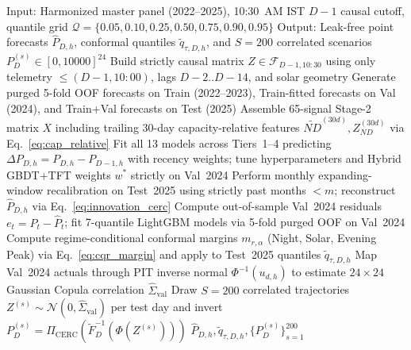 \documentclass[journal,10pt,twocolumn]{IEEEtran}
\begin{document}
\begin{algorithm*}[!t]
\caption{Strict D-1 Causal Stage-1 Exogenous Reconstruction, Multi-Tier Training, and Residual-CQR Scenario Generation}
\label{alg:causal_pipeline}
\footnotesize
\begin{algorithmic}[1]
\State Input: Harmonized master panel (2022--2025), 10:30~AM IST $D-1$ causal cutoff, quantile grid $\mathcal{Q} = \{0.05, 0.10, 0.25, 0.50, 0.75, 0.90, 0.95\}$
\State Output: Leak-free point forecasts $\hat{P}_{D,h}$, conformal quantiles $\tilde{q}_{\tau, D, h}$, and $S=200$ correlated scenarios $P_D^{(s)} \in [0, 10000]^{24}$
    \State Build strictly causal matrix $Z \in \mathcal{F}_{D-1, 10:30}$ using only telemetry $\le (D-1, 10:00)$, lags $D-2..D-14$, and solar geometry
    \State Generate purged 5-fold OOF forecasts on Train (2022--2023), Train-fitted forecasts on Val (2024), and Train+Val forecasts on Test (2025)
\EndFor
\State Assemble 65-signal Stage-2 matrix $X$ including trailing 30-day capacity-relative features $\widetilde{ND}^{(30d)}, Z_{ND}^{(30d)}$ via Eq.~\ref{eq:cap_relative}
\State Fit all 13 models across Tiers~1--4 predicting $\Delta P_{D,h} = P_{D,h} - P_{D-1,h}$ with recency weights; tune hyperparameters and Hybrid GBDT+TFT weights $w^*$ strictly on Val~2024
\State Perform monthly expanding-window recalibration on Test~2025 using strictly past months $< m$; reconstruct $\hat{P}_{D,h}$ via Eq.~\ref{eq:innovation_cerc}
\State Compute out-of-sample Val~2024 residuals $e_t = P_t - \hat{P}_t$; fit 7-quantile LightGBM models via 5-fold purged OOF on Val~2024
\State Compute regime-conditional conformal margins $m_{r, \alpha}$ (Night, Solar, Evening Peak) via Eq.~\ref{eq:cqr_margin} and apply to Test~2025 quantiles $\tilde{q}_{\tau, D, h}$
\State Map Val~2024 actuals through PIT inverse normal $\Phi^{-1}(u_{d,h})$ to estimate $24 \times 24$ Gaussian Copula correlation $\hat{\Sigma}_{\text{val}}$
\State Draw $S=200$ correlated trajectories $Z^{(s)} \sim \mathcal{N}(0, \hat{\Sigma}_{\text{val}})$ per test day and invert $P_D^{(s)} = \Pi_{\text{CERC}}(\tilde{F}_{D}^{-1}(\Phi(Z^{(s)})))$
\State \Return $\hat{P}_{D,h}, \tilde{q}_{\tau, D, h}, \{P_D^{(s)}\}_{s=1}^{200}$
\end{algorithmic}
\end{algorithm*}
\end{document}
